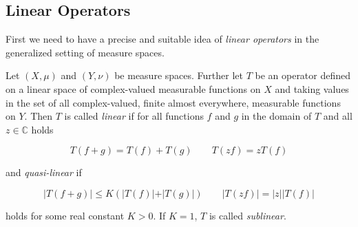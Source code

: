 \subsection{Linear Operators}
First we need to have a precise and suitable idea of \emph{linear operators} in the generalized setting of measure spaces.
\vspace{2mm}
\begin{mdframed}
	\begin{definition}
		Let $(X,\mu)$ and $(Y,\nu)$ be measure spaces. Further let $T$ be an operator defined on a linear space of complex-valued measurable functions on $X$ and taking values in the set of all complex-valued, finite almost everywhere, measurable functions on $Y$. Then $T$ is called \emph{linear} if for all functions $f$ and $g$ in the domain of $T$ and all $z \in \mathbb{C}$ holds

		\begin{equation}
			T\left( f + g \right) = T(f) + T(g) \qquad T\left( zf \right) = zT(f)
			\label{eq:linear}
		\end{equation}

		and \emph{quasi-linear} if

		\begin{equation}
			\vert T\left( f + g \right) \vert \leqslant K \left( \vert T(f)\vert + \vert T(g)\vert \right) \qquad \vert T(zf) \vert = \vert z\vert \vert T(f)\vert
			\label{eq:quasilinear}
		\end{equation}

		holds for some real constant $K > 0$. If $K = 1$, $T$ is called \emph{sublinear}.
	\end{definition}
\end{mdframed}





\originalsectionstyle

